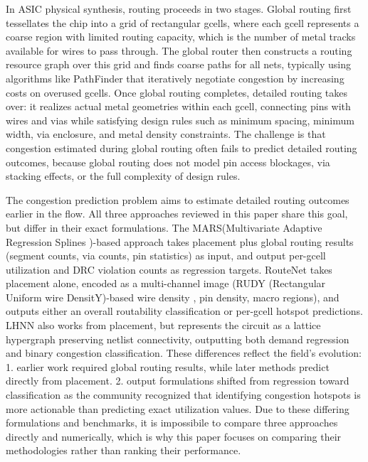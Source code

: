 \documentclass[sigconf]{acmart}
\begin{document}
In ASIC physical synthesis, routing proceeds in two stages. Global routing first tessellates the chip into a grid of rectangular gcells, where each gcell represents a coarse region with limited routing capacity, which is the number of metal tracks available for wires to pass through. 
The global router then constructs a routing resource graph over this grid and finds coarse paths for all nets, typically using algorithms like PathFinder that iteratively negotiate congestion by increasing costs on overused gcells. Once global routing completes, detailed routing takes over: it realizes actual metal geometries within each gcell, connecting pins with wires and vias while satisfying design 
rules such as minimum spacing, minimum width, via enclosure, and metal density constraints. The challenge is that congestion estimated during global routing often fails to predict detailed routing outcomes, because global routing does not model pin access blockages, via stacking effects, or the full complexity of design rules.

The congestion prediction problem aims to estimate detailed routing outcomes earlier in the flow. All three approaches reviewed in this paper share this goal, but differ in their exact formulations. The MARS(Multivariate Adaptive Regression Splines \cite{friedman1991mars})-based approach \cite{qi2014accurate} takes placement plus global routing results (segment counts, via counts, pin statistics) as input, and output per-gcell utilization and DRC violation counts as regression targets. RouteNet \cite{xie2018routenet} takes placement alone, encoded as a multi-channel image (RUDY (Rectangular Uniform wire DensitY)-based wire density \cite{spindler2007rudy}, pin density, macro regions), and outputs either an overall routability classification or per-gcell hotspot predictions. LHNN \cite{wang2022lhnn} also works from placement, but represents the circuit as a lattice hypergraph preserving netlist connectivity, outputting both demand regression and binary congestion classification. These differences reflect the field's evolution: 1. earlier work required global routing results, while later methods predict directly from placement. 2. output formulations shifted from regression toward classification as the community recognized that identifying congestion hotspots is more actionable than predicting exact utilization values. Due to these differing formulations and benchmarks, it is impossibile to compare three approaches directly and numerically, which is why this paper focuses on comparing their methodologies rather than ranking their performance.
\end{document}
